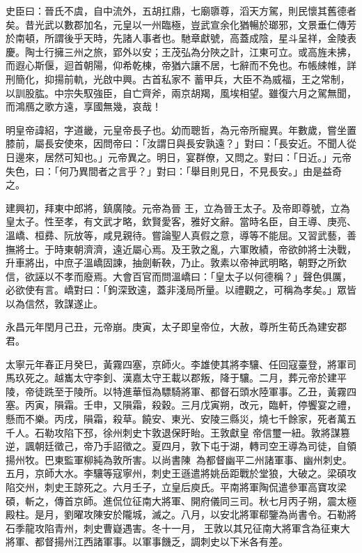 \begin{pinyinscope}
 史臣曰：晉氏不虞，自中流外，五胡扛鼎，七廟隳尊，滔天方駕，則民懷其舊德者矣。昔光武以數郡加名，元皇以一州臨極，豈武宣余化猶暢於瑯邪，文景垂仁傳芳於南頓，所謂後乎天時，先諸人事者也。馳章獻號，高蓋成陰，星斗呈祥，金陵表慶。陶士行擁三州之旅，郢外以安；王茂弘為分陜之計，江東可立。或高旌未拂，而遐心斯偃，迴首朝陽，仰希乾棟，帝猶六讓不居，七辭而不免也。布帳綀帷，詳刑簡化，抑揚前軌，光啟中興。古首私家不
 蓄甲兵，大臣不為威福，王之常制，以訓股肱。中宗失馭強臣，自亡齊斧，兩京胡羯，風埃相望。雖復六月之駕無聞，而鴻鴈之歌方遠，享國無幾，哀哉！



 明皇帝諱紹，字道畿，元皇帝長子也。幼而聰哲，為元帝所寵異。年數歲，嘗坐置膝前，屬長安使來，因問帝曰：「汝謂日與長安孰遠？」對曰：「長安近。不聞人從日邊來，居然可知也。」元帝異之。明日，宴群僚，又問之。對曰：「日近。」元帝失色，曰：「何乃異間者之言乎？」對曰：「舉目則見日，不見長安。」由是益奇之。



 建興初，拜東中郎將，鎮廣陵。元帝為晉
 王，立為晉王太子。及帝即尊號，立為皇太子。性至孝，有文武才略，欽賢愛客，雅好文辭。當時名臣，自王導、庚亮、溫嶠、桓彞、阮放等，咸見親待。嘗論聖人真假之意，導等不能屈。又習武藝，善撫將士。于時東朝濟濟，遠近屬心焉。及王敦之亂，六軍敗績，帝欲帥將士決戰，升車將出，中庶子溫嶠固諫，抽劍斬鞅，乃止。敦素以帝神武明略，朝野之所欽信，欲誣以不孝而廢焉。大會百官而問溫嶠曰：「皇太子以何德稱？」聲色俱厲，必欲使有言。嶠對曰：「鉤深致遠，蓋非淺局所量。以禮觀之，可稱為孝矣。」眾皆以為信然，敦謀遂止。



 永昌元年閏月己丑，元帝崩。庚寅，太子即皇帝位，大赦，尊所生荀氏為建安郡君。



 太寧元年春正月癸巳，黃霧四塞，京師火。李雄使其將李驤、任回寇臺登，將軍司馬玖死之。越巂太守李釗、漢嘉太守王載以郡叛，降于驤。二月，葬元帝於建平陵，帝徒跣至于陵所。以特進華恒為驃騎將軍、都督石頭水陸軍事。乙丑，黃霧四塞。丙寅，隕霜。壬申，又隕霜，殺穀。三月戊寅朔，改元，臨軒，停饗宴之禮，懸而不樂。丙戌，隕霜，殺草。饒安、東光、安陵三縣災，燒七千餘家，死者萬五千人。石勒攻陷下邳，徐州刺史卞敦退保盱眙。王敦獻皇
 帝信璽一紐。敦將謀篡逆，諷朝廷徵己，帝乃手詔徵之。夏四月，敦下屯于湖，轉司空王導為司徒，自領揚州牧。巴東監軍柳純為敦所害。以尚書陳為都督幽平二州諸軍事、幽州刺史。五月，京師大水。李驤等寇寧州，刺史王遜遣將姚岳距戰於堂狼，大破之。梁碩攻陷交州，刺史王諒死之。六月壬子，立皇后庾氏。平南將軍陶侃遣參軍高寶攻梁碩，斬之，傳首京師。進侃位征南大將軍、開府儀同三司。秋七月丙子朔，震太極殿柱。是月，劉曜攻陳安於隴城，滅之。八月，以安北將軍郗鑒為尚書令。石勒將石季龍攻陷青州，刺史曹嶷遇害。冬十一月，
 王敦以其兄征南大將軍含為征東大將軍、都督揚州江西諸軍事。以軍事饑乏，調刺史以下米各有差。




\end{pinyinscope}
